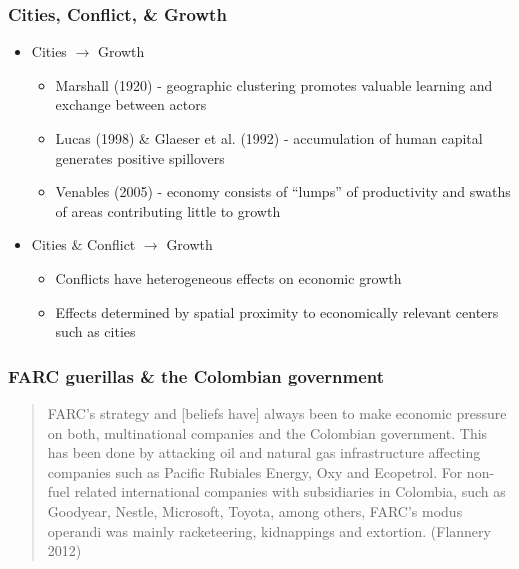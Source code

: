 \begin{frame}
\frametitle{Cities, Conflict, \& Growth}

\begin{itemize}
	\item Cities $\rightarrow$ Growth
	\begin{itemize}
	\item Marshall (1920) - geographic clustering promotes valuable learning and exchange between actors
	\item Lucas (1998) \& Glaeser et al. (1992) - accumulation of human capital generates positive spillovers
	\item Venables (2005) - economy consists of ``lumps'' of productivity and swaths of areas contributing little to growth	
	\end{itemize}
	\item Cities \& Conflict $\rightarrow$ Growth
	\begin{itemize}
	\item Conflicts have heterogeneous effects on economic growth 
	\item Effects determined by spatial proximity to economically relevant centers such as cities
	\end{itemize}
\end{itemize}

\end{frame}

\begin{frame}
\frametitle{FARC guerillas \& the Colombian government}

\begin{quote}FARC's strategy and [beliefs have] always been to make economic pressure on both, multinational companies and the Colombian government. This has been done by attacking oil and natural gas infrastructure affecting companies such as Pacific Rubiales Energy, Oxy and Ecopetrol. For non-fuel related international companies with subsidiaries in Colombia, such as Goodyear, Nestle, Microsoft, Toyota, among others, FARC’s modus operandi was mainly racketeering, kidnappings and extortion. (Flannery 2012)\end{quote}

\end{frame}

